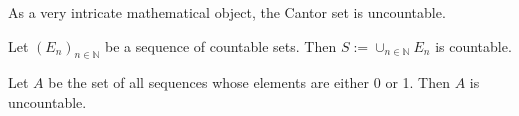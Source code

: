 \begin{rem}
  As a very intricate mathematical object, 
  the Cantor set is uncountable.
\end{rem}

\begin{thm}
  \label{thm:coutableSequenceUnion}
  Let $(E_n)_{n\in\mathbb{N}}$ be a sequence of countable sets.
  Then $S:=\cup_{n\in\mathbb{N}}E_n$ is countable.
\end{thm}

\begin{thm}
  \label{thm:uncountableSequenceOf0and1}
  Let $A$ be the set of all sequences whose elements
  are either 0 or 1.
  Then $A$ is uncountable. 
\end{thm}

